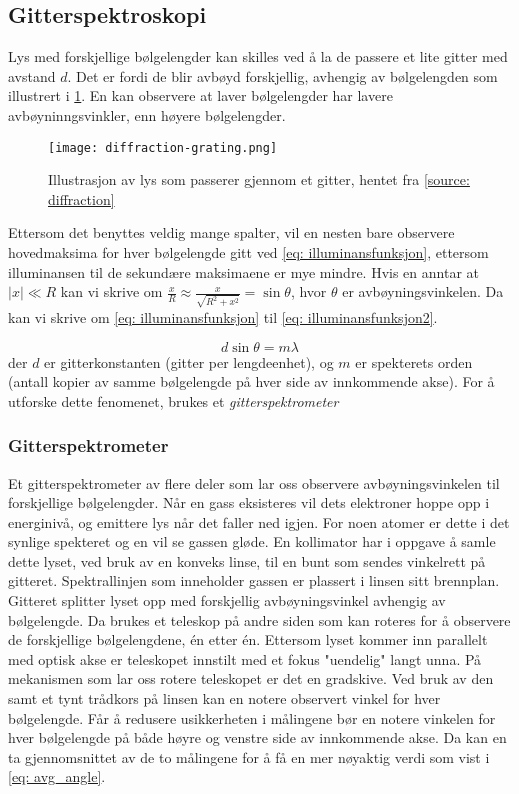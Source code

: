 \documentclass[reprint,norsk,notitlepage,floatfix]{revtex4-2}
\begin{document}
  \subsection{Gitterspektroskopi}
    Lys med forskjellige bølgelengder kan skilles ved å la de passere et lite gitter med avstand $d$. Det er fordi de blir avbøyd forskjellig, avhengig av bølgelengden som illustrert i \cref{fig: gitter}. En kan observere at laver bølgelengder har lavere avbøyninngsvinkler, enn høyere bølgelengder.  
    
    \begin{figure}[h!]
      \centering
      \texttt{[image: diffraction-grating.png]}
      \caption{Illustrasjon av lys som passerer gjennom et gitter, hentet fra \ref{source: diffraction}}
      \label{fig: gitter}
    \end{figure}
    
    Ettersom det benyttes veldig mange spalter, vil en nesten bare observere hovedmaksima for hver bølgelengde gitt ved \cref{eq: illuminansfunksjon}, ettersom illuminansen til de sekundære maksimaene er mye mindre. Hvis en anntar at $\left|x\right| ≪ R$ kan vi skrive om $\displaystyle \frac{x}{R} ≈ \frac{x}{\sqrt{R^2 + x^2}} = \sin θ$, hvor $θ$ er avbøyningsvinkelen. Da kan vi skrive om \cref{eq: illuminansfunksjon} til \cref{eq: illuminansfunksjon2}.
    
    \begin{equation}\label{eq: illuminansfunksjon2}
      d\sin θ = mλ
    \end{equation}
    der $d$ er gitterkonstanten (gitter per lengdeenhet), og $m$ er spekterets orden (antall kopier av samme bølgelengde på hver side av innkommende akse). For å utforske dette fenomenet, brukes et \textit{gitterspektrometer}
    
    \subsubsection*{Gitterspektrometer}
      Et gitterspektrometer av flere deler som lar oss observere avbøyningsvinkelen til forskjellige bølgelengder. Når en gass eksisteres vil dets elektroner hoppe opp i energinivå, og emittere lys når det faller ned igjen. For noen atomer er dette i det synlige spekteret og en vil se gassen gløde. En kollimator har i oppgave å samle dette lyset, ved bruk av en konveks linse, til en bunt som sendes vinkelrett på gitteret. Spektrallinjen som inneholder gassen er plassert i linsen sitt brennplan. Gitteret splitter lyset opp med forskjellig avbøyningsvinkel avhengig av bølgelengde. Da brukes et teleskop på andre siden som kan roteres for å observere de forskjellige bølgelengdene, én etter én. Ettersom lyset kommer inn parallelt med optisk akse er teleskopet innstilt med et fokus "uendelig" langt unna. På mekanismen som lar oss rotere teleskopet er det en gradskive. Ved bruk av den samt et tynt trådkors på linsen kan en notere observert vinkel for hver bølgelengde. Får å redusere usikkerheten i målingene bør en notere vinkelen for hver bølgelengde på både høyre og venstre side av innkommende akse. Da kan en ta gjennomsnittet av de to målingene for å få en mer nøyaktig verdi som vist i \cref{eq: avg_angle}.
      
\end{document}
